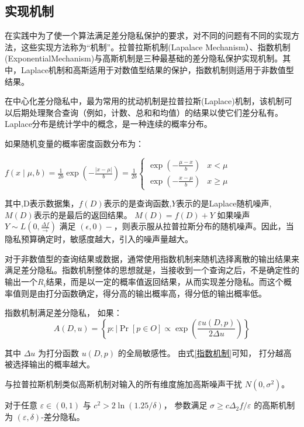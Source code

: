 \subsection{实现机制}
在实践中为了使一个算法满足差分隐私保护的要求，对不同的问题有不同的实现方法，这些实现方法称为“机制”。拉普拉斯机制(Lapalace Mechanism）、指数机制(ExponentialMechanism)与高斯机制是三种最基础的差分隐私保护实现机制。其中，Laplace机制和高斯适用于对数值型结果的保护，指数机制则适用于非数值型结果。

在中心化差分隐私中，最为常用的扰动机制是拉普拉斯(Laplace)机制，该机制可以后期处理聚合查询（例如，计数、总和和均值）的结果以使它们差分私有。
Laplace分布是统计学中的概念，是一种连续的概率分布。

\begin{theorem}[拉普拉斯机制]\label{拉普拉斯机制}
如果随机变量的概率密度函数分布为：

$f(x \mid \mu, b)=\frac{1}{2 b} \exp \left(-\frac{|x-\mu|}{b}\right)=\frac{1}{2 b}\left\{\begin{array}{ll}\exp \left(-\frac{\mu-x}{b}\right) & x<\mu \\ \exp \left(-\frac{x-\mu}{b}\right) & x \geq \mu\end{array}\right.$
\end{theorem}

其中,D表示数据集，$f(D)$表示的是查询函数,$Y$表示的是Laplace随机噪声,$M(D)$表示的是最后的返回结果。
$M(D)=f(D)+Y$
如果噪声 $Y \sim L\left(0,\frac{\Delta f}{\longrightarrow}\right)$ 满足 $(\epsilon,0)-$，则表示服从拉普拉斯分布的随机噪声。因此，当隐私预算确定时，敏感度越大，引入的噪声量越大。

对于非数值型的查询结果或数据，通常使用指数机制来随机选择离散的输出结果来满足差分隐私。指数机制整体的思想就是，当接收到一个查询之后，不是确定性的输出一个$R_{i}$结果，而是以一定的概率值返回结果，从而实现差分隐私。而这个概率值则是由打分函数确定，得分高的输出概率高，得分低的输出概率低。

\begin{theorem}[指数机制]\label{指数机制}
指数机制满足差分隐私， 如果：
$$
A(D,u)=\left\{p: \mid \operatorname{Pr}[p \in O] \propto \exp \left(\frac{\varepsilon u(D,p)}{2 \Delta u}\right)\right\}
$$
\end{theorem}
其中 $\Delta u$ 为打分函数 $u(D,p)$ 的全局敏感性。 由式\ref{指数机制}可知， 打分越高被选择输出的概率越大。

与拉普拉斯机制类似高斯机制对输入的所有维度施加高斯噪声干扰 $N\left(0,\sigma^{2}\right)$。
\begin{theorem}[高斯机制]\label{高斯机制}
对于任意 $\varepsilon \in(0,1)$ 与 $c^{2}>2 \ln (1.25 / \delta)$， 参数满足 $\sigma \geq c \Delta_{2} f / \varepsilon$ 的高斯机制为 $(\varepsilon,\delta)$-差分隐私。
\end{theorem}

